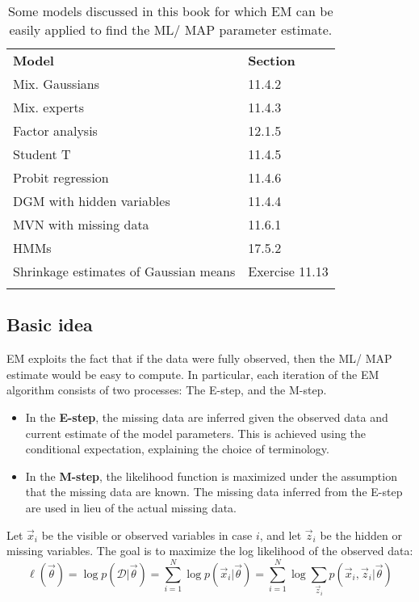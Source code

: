 \begin{table}
\caption{Some models discussed in this book for which EM can be easily applied to find the ML/ MAP parameter estimate.}
\label{tab:summary-of-the-applications-of-EM}
\centering
\begin{tabular}{ll}
\hline\noalign{\smallskip}
\textbf{Model} & \textbf{Section} \\
\noalign{\smallskip}\svhline\noalign{\smallskip}
Mix. Gaussians & 11.4.2 \\
Mix. experts & 11.4.3 \\
Factor analysis & 12.1.5 \\
Student T & 11.4.5 \\
Probit regression & 11.4.6 \\
DGM with hidden variables & 11.4.4 \\
MVN with missing data & 11.6.1 \\
HMMs & 17.5.2 \\
Shrinkage estimates of Gaussian means & Exercise 11.13 \\
\noalign{\smallskip}\hline
\end{tabular}
\end{table}


\subsection{Basic idea}
EM exploits the fact that if the data were fully observed, then the ML/ MAP estimate would be easy to compute. In particular, each iteration of the EM algorithm consists of two processes: The E-step, and the M-step. 
\begin{itemize}
\item{In the \textbf{E-step}, the missing data are inferred given the observed data and current estimate of the model parameters. This is achieved using the conditional expectation, explaining the choice of terminology.}
\item{In the \textbf{M-step}, the likelihood function is maximized under the assumption that the missing data are known. The missing data inferred from the E-step are used in lieu of the actual missing data.}
\end{itemize}

Let $\vec{x}_i$ be the visible or observed variables in case $i$, and let $\vec{z}_i$ be the hidden or missing variables. The goal is to maximize the log likelihood of the observed data:
\begin{equation}
\ell(\vec{\theta})=\log p(\mathcal{D}|\vec{\theta})=\sum\limits_{i=1}^N \log p(\vec{x}_i|\vec{\theta})=\sum\limits_{i=1}^N \log{\sum\limits_{\vec{z}_i} p(\vec{x}_i,\vec{z}_i|\vec{\theta})}
\end{equation}

